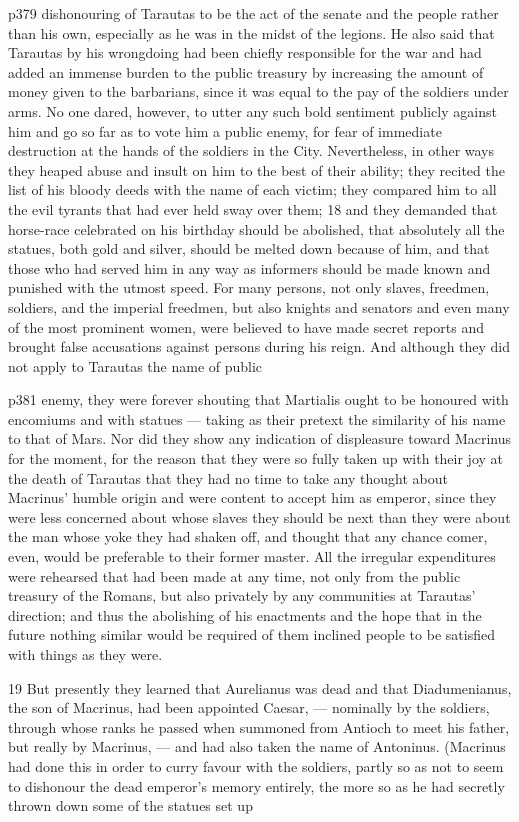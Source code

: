 p379 dishonouring of Tarautas to be the act of the senate and the people rather than his own, especially as he was in the midst of the legions. He also said that Tarautas by his wrongdoing had been chiefly responsible for the war and had added an immense burden to the public treasury by increasing the amount of money given to the barbarians, since it was equal to the pay of the soldiers under arms. No one dared, however, to utter any such bold sentiment publicly against him and go so far as to vote him a public enemy, for fear of immediate destruction at the hands of the soldiers in the City. Nevertheless, in other ways they heaped abuse and insult on him to the best of their ability; they recited the list of his bloody deeds with the name of each victim; they compared him to all the evil tyrants that had ever held sway over them; 18
and they demanded that horse-race celebrated on his birthday should be abolished, that absolutely all the statues, both gold and silver, should be melted down because of him, and that those who had served him in any way as informers should be made known and punished with the utmost speed. For many persons, not only slaves, freedmen, soldiers, and the imperial freedmen, but also knights and senators and even many of the most prominent women, were believed to have made secret reports and brought false accusations against persons during his reign. And although they did not apply to Tarautas the name of public

p381 enemy, they were forever shouting that Martialis ought to be honoured with encomiums and with statues \texthebrew{—} taking as their pretext the similarity of his name to that of Mars. Nor did they show any indication of displeasure toward Macrinus for the moment, for the reason that they were so fully taken up with their joy at the death of Tarautas that they had no time to take any thought about Macrinus' humble origin and were content to accept him as emperor, since they were less concerned about whose slaves they should be next than they were about the man whose yoke they had shaken off, and thought that any chance comer, even, would be preferable to their former master. All the irregular expenditures were rehearsed that had been made at any time, not only from the public treasury of the Romans, but also privately by any communities at Tarautas' direction; and thus the abolishing of his enactments and the hope that in the future nothing similar would be required of them inclined people to be satisfied with things as they were.

19
But presently they learned that Aurelianus was dead and that Diadumenianus, the son of Macrinus, had been appointed Caesar, \texthebrew{—} nominally by the soldiers, through whose ranks he passed when summoned from Antioch to meet his father, but really by Macrinus, \texthebrew{—} and had also taken the name of Antoninus. (Macrinus had done this in order to curry favour with the soldiers, partly so as not to seem to dishonour the dead emperor's memory entirely, the more so as he had secretly thrown down some of the statues set up

